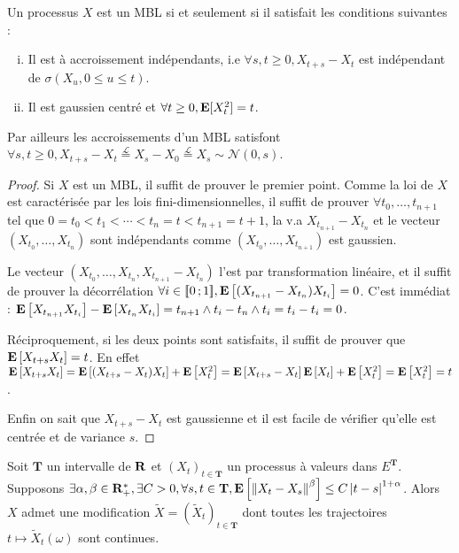 	\begin{pop}
		Un processus $X$ est un MBL si et seulement si il satisfait les conditions suivantes :
		\begin{enumerate}[(i)]
			\item Il est à accroissement indépendants, i.e $\forall s,t \geq 0, X_{t+s} - X_t$ est indépendant de $\sigma(X_u, 0 \leq u \leq t)$.
			\item Il est gaussien centré et $\forall t \geq 0, \mathbf{E}[X_t^2] = t$.
		\end{enumerate}
		Par ailleurs les accroissements d'un MBL satisfont $\forall s,t \geq 0, X_{t+s} - X_t \overset{\mathcal{L}}{=} X_s - X_0 \overset{\mathcal{L}}{=} X_s \sim \mathcal{N}(0,s)$.
	\end{pop}
	
	\begin{proof}
		Si $X$ est un MBL, il suffit de prouver le premier point.
		Comme la loi de $X$ est caractérisée par les lois fini-dimensionnelles, il suffit de prouver $\forall t_0,\ldots,t_{n + 1}$ tel que $0 = t_0 < t_1 < \cdots < t_n = t < t_{n + 1} = t + 1$, la v.a $X_{t_{n + 1}} - X_{t_n}$ et le vecteur $(X_{t_0},\ldots,X_{t_n})$ sont indépendants comme $(X_{t_0},\ldots,X_{t_{n + 1}})$ est gaussien.
		
		Le vecteur $(X_{t_0},\ldots,X_{t_n},X_{t_{n + 1}} - X_{t_n})$ l'est par transformation linéaire, et il suffit de prouver la décorrélation $\forall i \in \mathopen{[\![}0\mathclose{}\mathpunct{};1\mathclose{]\!]}, \mathbf{E} \left[ (X_{t_{n + 1}} - X_{t_n}) X_{t_i} \right] = 0$.
		C'est immédiat : $\mathbf{E} \left[ X_{t_{n + 1}} X_{t_i} \right] - \mathbf{E} \left[ X_{t_n} X_{t_i} \right] = t_{n + 1} \wedge t_i - t_n \wedge t_i = t_i - t_i = 0$.
		
		Réciproquement, si les deux points sont satisfaits, il suffit de prouver que $\mathbf{E} \left[ X_{t + s} X_t \right] = t$.
		En effet $\mathbf{E} \left[ X_{t + s} X_t \right] = \mathbf{E} \left[ (X_{t + s} - X_t) X_t \right] + \mathbf{E} \left[ X_t^2 \right] = \mathbf{E} \left[ X_{t + s} - X_t \right] \mathbf{E} \left[ X_t \right] + \mathbf{E} \left[ X_t^2 \right] = \mathbf{E} \left[ X_t^2 \right] = t$.
		
		Enfin on sait que $X_{t + s} - X_t$ est gaussienne et il est facile de vérifier qu'elle est centrée et de variance $s$.
	\end{proof}
	
	\begin{thm}[Kolmogorov]
		Soit $\mathbf{T}$ un intervalle de $\mathbf{R}$ et $(X_t)_{t \in \mathbf{T}}$ un processus à valeurs dans $E^{\mathbf{T}}$.
		Supposons $\exists \alpha,\beta \in \mathbf{R}_+^*, \exists C > 0, \forall s,t \in \mathbf{T}, \mathbf{E} \left[ \left\lVert X_t - X_s\right\rVert^\beta \right] \leq C \left\lvert t - s\right\rvert^{1 + \alpha}$.
		Alors $X$ admet une modification $\tilde{X} = \left( \tilde{X}_t \right)_{t \in \mathbf{T}}$ dont toutes les trajectoires $t \mapsto \tilde{X}_t(\omega)$ sont continues.
	\end{thm}
	
